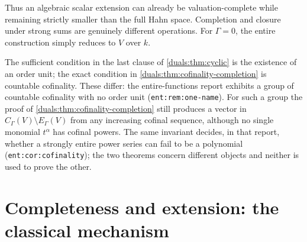 \documentclass[11pt,letterpaper]{article}
\numberwithin{equation}{section}
\theoremstyle{definition}
\theoremstyle{remark}
\newcommand{\R}{\mathbb R}
\newcommand{\HG}{H_\Gamma}
\newcommand{\VG}{V_\Gamma}
\newcommand{\EG}{E_\Gamma(V)}
\newcommand{\CG}{C_\Gamma(V)}
\newcommand{\sH}{\mathop{\sum}\nolimits^{\mathrm H}}
\newcommand{\lab}[1]{\texttt{#1}}
\begin{document}
Thus an algebraic scalar extension can already be valuation-complete
while remaining strictly smaller than the full Hahn space. Completion
and closure under strong sums are genuinely different operations.
For $\Gamma=0$, the entire construction simply reduces to $V$ over $k$.

\noindent[Added 1 October 2026, batch 73: the completion section of the
real-vector-space-structure report (its Section~12,
\lab{rvs:w:sec:completion}, from its source 52) is the diagonal case of
this section. Take $k=\R$ and $V=\R^{(\Gamma)}$ with basis
$(e_\gamma)_{\gamma\in\Gamma}$, and embed $\HG=\R((t^\Gamma))$ in $\VG$ by
$\iota(\sH_\gamma x_\gamma t^\gamma)=\sH_\gamma t^\gamma x_\gamma e_\gamma$.
Then $\iota^{-1}(\EG)$ is the finite-support part $\mathrm{Fin}_\Gamma$ of
$\HG$, and $\iota^{-1}(\CG)$ is the space $\mathrm{Lf}_\Gamma$ of series with
left-finite support. That report's Theorems~12.1 and~12.2 and
Proposition~12.3 are
\cref{duals:thm:completion,duals:thm:cyclic,duals:thm:cofinality-completion}
(with \cref{duals:lem:group}) and \cref{duals:thm:basechange}, pulled back
along $\iota$; its Theorem~12.4 separates $\mathrm{Lf}_\Gamma$ by real-valued
continuous functionals, a counterpart of \cref{duals:thm:separation}.
Neither space is $E_\Gamma(\R)$ or $C_\Gamma(\R)$, which are all of $\HG$.
No result here uses that report.]

\begin{remark}
\label{duals:rem:order-unit}
The sufficient condition in the last clause of \cref{duals:thm:cyclic} is
the existence of an order unit; the exact condition in
\cref{duals:thm:cofinality-completion} is countable cofinality. These
differ: the entire-functions report exhibits a group of countable
cofinality with no order unit (\lab{ent:rem:one-name}). For such a group
the proof of \cref{duals:thm:cofinality-completion} still produces a vector
in $C_\Gamma(V)\setminus E_\Gamma(V)$ from any increasing cofinal
sequence, although no single monomial $t^\alpha$ has cofinal powers. The
same invariant decides, in that report, whether a strongly entire power
series can fail to be a polynomial (\lab{ent:cor:cofinality}); the two
theorems concern different objects and neither is used to prove the other.
\end{remark}

\section{Completeness and extension: the classical mechanism}
\label{duals:sec:extension}
\end{document}

